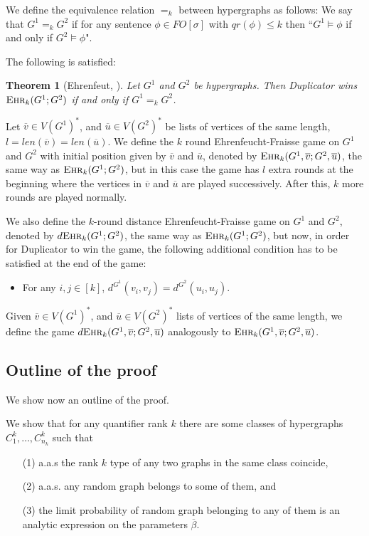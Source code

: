 \documentclass[12pt,notitlepage,a4paper]{article}
\newtheorem{theorem}{Theorem}[section]
\theoremstyle{definition}
\newcommand{\ehr}{\textsc{Ehr}}
\begin{document}
We define the equivalence relation $=_k$ between hypergraphs as follows:
We say that $G^1=_k G^2$ if for any sentence $\phi\in 
FO[\sigma]$ with $qr(\phi)\leq k$ then ``$G^1\models\phi$ if and 
only if $G^2\models\phi$". 
\par

The following is satisfied:

\begin{theorem}
	[Ehrenfeut, \citealp{ehrenfeucht1961application}] Let
	$G^1$ and $G^2$ be hypergraphs.
	Then Duplicator wins $\ehr_k(G^1;G^2)$
	if and only if $G^1=_k G^2$.	
\end{theorem}

Let $\overline{v}\in V(G^1)^*$, and 
$\overline{u}\in V(G^2)^*$ be lists of vertices of the same length, 
$l=len(\overline{v})=len(\overline{u})$. We define the $k$ round 
Ehrenfeucht-Fraisse game on $G^1$ and $G^2$ with initial position given
by $\overline{v}$ and $\overline{u}$, denoted by $\ehr_k(G^1,\overline{v};G^2,\overline{u})$,
the same way as $\ehr_k(G^1;G^2)$, but in this case the game has $l$ extra 
rounds at the beginning where the vertices in $\overline{v}$ and $\overline{u}$ are 
played successively. After this, $k$ more rounds are played normally. \par

We also define the $k$-round distance Ehrenfeucht-Fraisse game on 
$G^1$ and $G^2$, denoted by $d\ehr_k(G^1;G^2)$, the same way as
$\ehr_k(G^1;G^2)$, but now, in order for Duplicator to win the
game, the following additional condition has to be satisfied 
at the end of the game:
\begin{itemize}
	\item For any $i,j\in [k]$, $d^{G^1}(v_i,v_j)=d^{G^2}(u_i,u_j)$.
\end{itemize}

Given $\overline{v}\in V(G^1)^*$, and $\overline{u}\in V(G^2)^*$
lists of vertices of the same length,
we define the game 
$d\ehr_k(G^1,\overline{v};G^2,\overline{u})$ analogously to 
$\ehr_k(G^1,\overline{v};G^2,\overline{u})$.



\subsection{Outline of the proof}

We show now an outline of the proof. \par 
We show that for any quantifier rank $k$ there are some classes of
hypergraphs 
$C^k_1,\dots, C^k_{n_k}$ such that
\begin{itemize}[noitemsep, topsep=0pt]
	\item[(1)] a.a.s the rank $k$ type of any two graphs in the same class coincide, 
	\item[(2)] a.a.s. any random graph belongs to some of them, and
	\item[(3)] the limit probability of random graph belonging to 
	any of them is an analytic expression on the parameters $\overline{\beta}$. 
\end{itemize}
\end{document}

